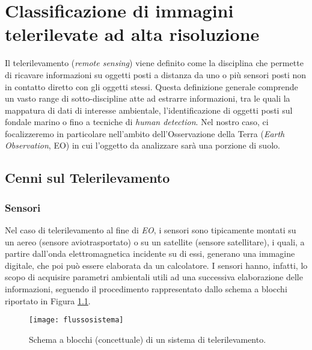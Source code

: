 
\chapter{Classificazione di immagini telerilevate ad alta risoluzione} 
\label{cap:telerilevamento} 

Il telerilevamento (\emph{remote sensing}) viene definito come la disciplina che permette di ricavare informazioni su oggetti posti a distanza da uno o più sensori posti non in contatto diretto con gli oggetti stessi.
Questa definizione generale comprende un vasto range di sotto-discipline atte ad estrarre informazioni, tra le quali la mappatura di dati di interesse ambientale, l'identificazione di oggetti posti sul fondale marino o fino a tecniche di \emph{human detection}.
Nel nostro caso, ci focalizzeremo in particolare nell'ambito dell'Osservazione della Terra (\emph{Earth Observation}, EO) in cui l'oggetto da analizzare sarà una porzione di suolo.
\clearpage


\section{Cenni sul Telerilevamento}


\subsection{Sensori}
Nel caso di telerilevamento al fine di \emph{EO}, i sensori sono tipicamente montati su un aereo (sensore aviotrasportato) o su un satellite (sensore satellitare), i quali, a partire dall'onda elettromagnetica incidente su di essi, generano una immagine digitale, che poi può essere elaborata da un calcolatore. 
I sensori hanno, infatti, lo scopo di acquisire parametri ambientali utili ad una successiva elaborazione delle informazioni, seguendo il procedimento rappresentato dallo schema a blocchi riportato in Figura \ref{fig:flussosistema}.

\begin{figure}[!ht]
\texttt{[image: flussosistema]}
\caption{Schema a blocchi (concettuale) di un sistema di telerilevamento.}
\label{fig:flussosistema}
\end{figure}

